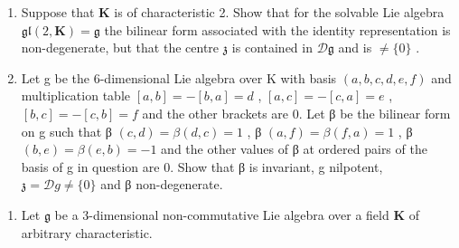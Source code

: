 \begin{enumerate}
\def\labelenumi{(\alph{enumi})}
\setcounter{enumi}{1}
\item
  Suppose that \(\mathbf{K}\) is of characteristic 2. Show that for the solvable Lie algebra \(\mathfrak{gl}(2,\mathbf{K}) = \mathfrak{g}\) the bilinear form associated with the identity representation is non-degenerate, but that the centre \(\mathfrak{z}\) is contained in \(\mathcal{D}\mathfrak{g}\) and is \(\neq \{0\}\) .
\item
  Let g be the 6-dimensional Lie algebra over K with basis \((a, b, c, d, e, f)\) and multiplication table \([a, b] = -[b, a] = d\) , \([a, c] = -[c, a] = e\) , \([b, c] = -[c, b] = f\) and the other brackets are 0. Let β be the bilinear form on g such that β \((c, d) = \beta(d, c) = 1\) , β \((a, f) = \beta(f, a) = 1\) , β \((b, e) = \beta(e, b) = -1\) and the other values of β at ordered pairs of the basis of g in question are 0. Show that β is invariant, g nilpotent, \(\mathfrak{z} = \mathcal{D}g \neq \{0\}\) and β non-degenerate.
\end{enumerate}

\begin{enumerate}
\def\labelenumi{\arabic{enumi}.}
\setcounter{enumi}{22}
\tightlist
\item
  Let \(\mathfrak{g}\) be a 3-dimensional non-commutative Lie algebra over a field \(\mathbf{K}\) of arbitrary characteristic.
\end{enumerate}

